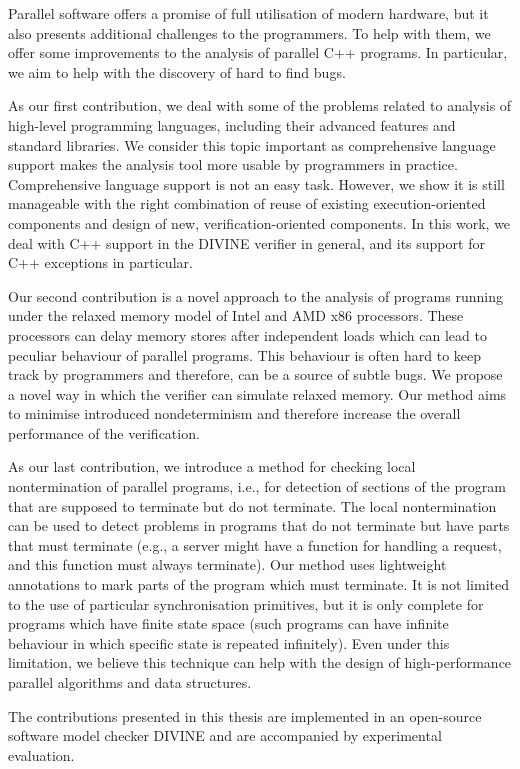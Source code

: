 Parallel software offers a promise of full utilisation of modern hardware,
but it also presents additional challenges to the programmers.
To help with them, we offer some improvements to the analysis of parallel
C++ programs.
In particular, we aim to help with the discovery of hard to find bugs.

As our first contribution, we deal with some of the problems related to
analysis of high-level programming languages, including their advanced features
and standard libraries.
We consider this topic important as comprehensive language support makes the
analysis tool more usable by programmers in practice.
Comprehensive language support is not an easy task.
However, we show it is still manageable with the right combination of reuse of
existing execution-oriented components and design of new, verification-oriented
components.
In this work, we deal with C++ support in the DIVINE verifier in general, and
its support for C++ exceptions in particular.

Our second contribution is a novel approach to the analysis of programs running
under the relaxed memory model of Intel and AMD x86 processors.
These processors can delay memory stores after independent loads which can lead
to peculiar behaviour of parallel programs.
This behaviour is often hard to keep track by programmers and therefore, can be
a source of subtle bugs.
We propose a novel way in which the verifier can simulate relaxed memory.
Our method aims to minimise introduced nondeterminism and therefore increase
the overall performance of the verification.

As our last contribution, we introduce a method for checking local
nontermination of parallel programs, i.e., for detection of sections of the
program that are supposed to terminate but do not terminate.
The local nontermination can be used to detect problems in programs that do not
terminate but have parts that must terminate (e.g., a server might have a
function for handling a request, and this function must always terminate).
Our method uses lightweight annotations to mark parts of the program which must
terminate.
It is not limited to the use of particular synchronisation primitives, but it
is only complete for programs which have finite state space (such programs can
have infinite behaviour in which specific state is repeated infinitely).
Even under this limitation, we believe this technique can help with the design
of high-performance parallel algorithms and data structures.

The contributions presented in this thesis are implemented in an open-source
software model checker DIVINE and are accompanied by experimental evaluation.

